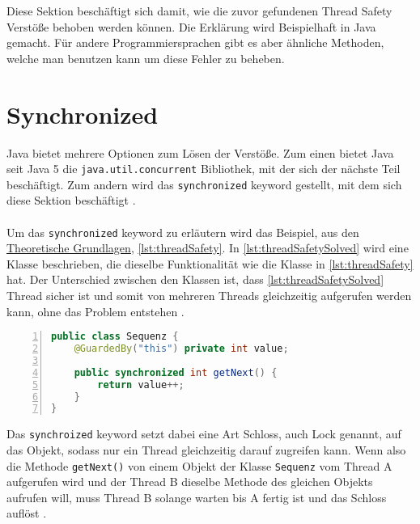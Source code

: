 \label{sec:loesen}

Diese Sektion beschäftigt sich damit, wie die zuvor gefundenen Thread Safety Verstöße behoben werden können. Die Erklärung wird Beispielhaft in Java gemacht. Für andere Programmiersprachen gibt es aber ähnliche Methoden, welche man benutzen kann um diese Fehler zu beheben.

\section{Synchronized}

 Java bietet mehrere Optionen zum Lösen der Verstöße. Zum einen bietet Java seit Java 5 die \texttt{java.util.concurrent} Bibliothek, mit der sich der nächste Teil beschäftigt. Zum andern wird das \texttt{synchronized} keyword gestellt, mit dem sich diese Sektion beschäftigt \cite[vgl.][121]{fekete_teaching_nodate}. \\
\\
 Um das \texttt{synchronized} keyword zu erläutern wird das Beispiel, aus den \hyperref[sec:threads]{Theoretische Grundlagen}, \ref{lst:threadSafety}. In \ref{lst:threadSafetySolved} wird eine Klasse beschrieben, die dieselbe Funktionalität wie die Klasse in \ref{lst:threadSafety} hat. Der Unterschied zwischen den Klassen ist, dass \ref{lst:threadSafetySolved} Thread sicher ist und somit von mehreren Threads gleichzeitig aufgerufen werden kann, ohne das Problem entstehen \cite[vgl.][5-6]{brian}. 
\\
 \begin{lstlisting}[language=Java,frame=tb,caption={Thread-safe Sequence Generator \cite{brian}}, label={lst:threadSafetySolved}, numbers=left, stepnumber=1, captionpos=b, tabsize=4]
public class Sequenz {
	@GuardedBy("this") private int value;

	public synchronized int getNext() {
		return value++;
	}
}
\end{lstlisting}


Das \texttt{synchroized} keyword setzt dabei eine Art Schloss, auch Lock genannt, auf das Objekt, sodass nur ein Thread gleichzeitig darauf zugreifen kann. Wenn also die Methode \texttt{getNext()} von einem Objekt der Klasse \texttt{Sequenz} vom Thread A aufgerufen wird und der Thread B dieselbe Methode des gleichen Objekts aufrufen will, muss Thread B solange warten bis A fertig ist und das Schloss auflöst \cite[vgl.][17]{brian}.



